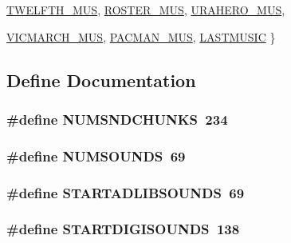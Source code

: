 \begin{DoxyCompactItemize}
\hyperlink{BUDIOWL6_8H_a196fbe29c4c02d90973f0b611ed0958ba2daba453f800e809bfb4fca6124da377}{TWELFTH\_\-MUS}, 
\hyperlink{BUDIOWL6_8H_a196fbe29c4c02d90973f0b611ed0958ba69e9e273ab13839b09e0976829002046}{ROSTER\_\-MUS}, 
\hyperlink{BUDIOWL6_8H_a196fbe29c4c02d90973f0b611ed0958ba7a71704b46eb8baaa32e6f817634328d}{URAHERO\_\-MUS}, 
\par
\hyperlink{BUDIOWL6_8H_a196fbe29c4c02d90973f0b611ed0958ba26a6deb65452e9b3f46d3e8571d2d2f7}{VICMARCH\_\-MUS}, 
\hyperlink{BUDIOWL6_8H_a196fbe29c4c02d90973f0b611ed0958ba69e6ef1a3a2ca4f191c98b37d6a8f0a9}{PACMAN\_\-MUS}, 
\hyperlink{BUDIOWL6_8H_a196fbe29c4c02d90973f0b611ed0958ba4c2fa07a163e141352f7e828f629dd59}{LASTMUSIC}
 \}
\end{DoxyCompactItemize}


\subsection{Define Documentation}
\hypertarget{AUDIOWL1_8H_adb660029e11963733384781d8bd6dc24}{
\subsubsection[{NUMSNDCHUNKS}]{\setlength{\rightskip}{0pt plus 5cm}\#define NUMSNDCHUNKS~234}}
\label{AUDIOWL1_8H_adb660029e11963733384781d8bd6dc24}
\hypertarget{AUDIOWL1_8H_aa948e91a657468d5faa690ec1a89230b}{
\subsubsection[{NUMSOUNDS}]{\setlength{\rightskip}{0pt plus 5cm}\#define NUMSOUNDS~69}}
\label{AUDIOWL1_8H_aa948e91a657468d5faa690ec1a89230b}
\hypertarget{AUDIOWL1_8H_a7d40bf6bf62cde9ae5f212e063328200}{
\subsubsection[{STARTADLIBSOUNDS}]{\setlength{\rightskip}{0pt plus 5cm}\#define STARTADLIBSOUNDS~69}}
\label{AUDIOWL1_8H_a7d40bf6bf62cde9ae5f212e063328200}
\hypertarget{AUDIOWL1_8H_adb5a42984ba81d350a944cc41434a6f7}{
\subsubsection[{STARTDIGISOUNDS}]{\setlength{\rightskip}{0pt plus 5cm}\#define STARTDIGISOUNDS~138}}
